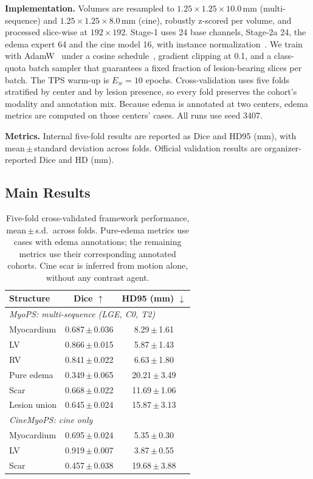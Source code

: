 \documentclass[runningheads]{llncs}
\begin{document}
\noindent\textbf{Implementation.} Volumes are resampled to
$1.25\times1.25\times10.0$\,mm (multi-sequence) and
$1.25\times1.25\times8.0$\,mm (cine), robustly z-scored per volume, and processed
slice-wise at $192\times192$. Stage-1 uses 24 base channels, Stage-2a 24, the
edema expert 64 and the cine model 16, with instance
normalization~\cite{ulyanov2016instance}. We train with
AdamW~\cite{loshchilov2019adamw} under a cosine schedule~\cite{loshchilov2017sgdr},
gradient clipping at 0.1, and a class-quota batch sampler that guarantees a fixed
fraction of lesion-bearing slices per batch. The TPS warm-up is $E_w=10$ epochs.
Cross-validation uses five folds stratified by center and by lesion presence, so
every fold preserves the cohort's modality and annotation mix. Because edema is
annotated at two centers, edema metrics are computed on those centers'
cases. All runs use seed 3407.

\noindent\textbf{Metrics.} Internal five-fold results are reported as Dice
and HD95 (mm), with mean\,$\pm$\,standard deviation across folds. Official
validation results are organizer-reported Dice and HD (mm).

\subsection{Main Results}

\begin{table}[t]
\centering
\caption{Five-fold cross-validated framework performance, mean\,$\pm$\,s.d.\
across folds. Pure-edema metrics use cases with edema annotations; the remaining
metrics use their corresponding annotated cohorts. Cine scar is inferred from
motion alone, without any contrast agent.}
\label{tab:main}
\begin{tabular}{lcc}
\toprule
Structure & Dice $\uparrow$ & HD95 (mm) $\downarrow$ \\
\midrule
\multicolumn{3}{l}{\textit{MyoPS: multi-sequence (LGE, C0, T2)}}\\
\quad Myocardium & 0.687\,{\tiny $\pm$\,0.036} & 8.29\,{\tiny $\pm$\,1.61} \\
\quad LV & 0.866\,{\tiny $\pm$\,0.015} & 5.87\,{\tiny $\pm$\,1.43} \\
\quad RV & 0.841\,{\tiny $\pm$\,0.022} & 6.63\,{\tiny $\pm$\,1.80} \\
\quad Pure edema & 0.349\,{\tiny $\pm$\,0.065} & 20.21\,{\tiny $\pm$\,3.49} \\
\quad Scar & 0.668\,{\tiny $\pm$\,0.022} & 11.69\,{\tiny $\pm$\,1.06} \\
\quad Lesion union & 0.645\,{\tiny $\pm$\,0.024} & 15.87\,{\tiny $\pm$\,3.13} \\
\midrule
\multicolumn{3}{l}{\textit{CineMyoPS: cine only}}\\
\quad Myocardium & 0.695\,{\tiny $\pm$\,0.024} & 5.35\,{\tiny $\pm$\,0.30} \\
\quad LV & 0.919\,{\tiny $\pm$\,0.007} & 3.87\,{\tiny $\pm$\,0.55} \\
\quad Scar & 0.457\,{\tiny $\pm$\,0.038} & 19.68\,{\tiny $\pm$\,3.88} \\
\bottomrule
\end{tabular}
\end{table}
\end{document}
